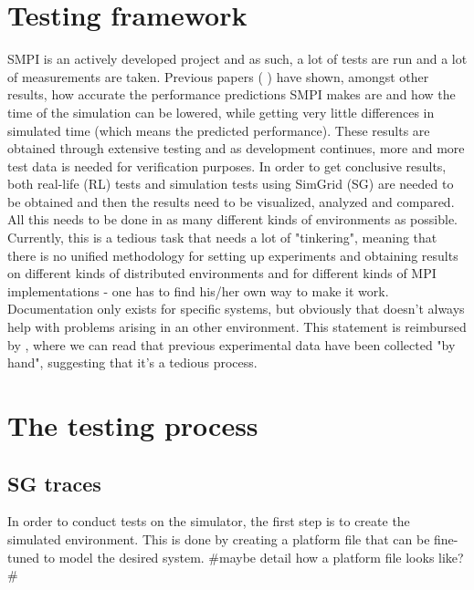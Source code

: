 \section{Testing framework}
SMPI is an actively developed project and as such, a lot of tests are
run and a lot of measurements are taken. Previous papers
(\cite{csgscq11} \cite{bdglmqssv13}) have shown, amongst other
results, how accurate the performance predictions SMPI makes are and
how the time of the simulation can be lowered, while getting very
little differences in simulated time (which means the predicted
performance). These results are obtained through extensive testing and
as development continues, more and more test data is needed for
verification purposes. In order to get conclusive results, both
real-life (RL) tests and simulation tests using SimGrid (SG) are
needed to be obtained and then the results need to be visualized,
analyzed and compared. All this needs to be done in as many different
kinds of environments as possible. Currently, this is a tedious task
that needs a lot of "tinkering", meaning that there is no unified
methodology for setting up experiments and obtaining results on
different kinds of distributed environments and for different kinds of
MPI implementations - one has to find his/her own way to make it
work. Documentation only exists for specific systems, but obviously
that doesn't always help with problems arising in an other
environment. This statement is reimbursed by \cite{bdglmqssv13}, where
we can read that previous experimental data have been collected "by
hand", suggesting that it's a tedious process.
\section{The testing process}
\subsection{SG traces}
In order to conduct tests on the simulator, the first step is to
create the simulated environment. This is done by creating a platform
file that can be fine-tuned to model the desired system. \#maybe
detail how a platform file looks like?\#
